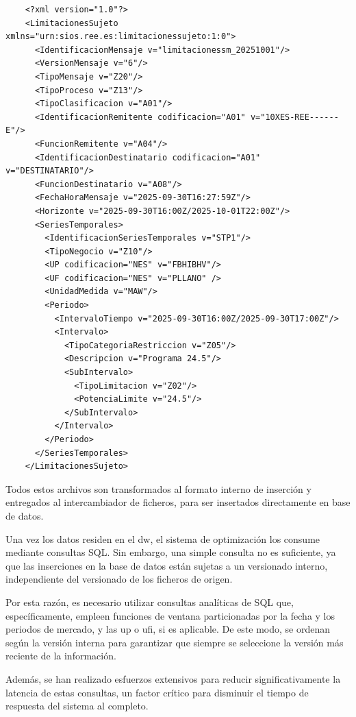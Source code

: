 \begin{samepage}
  \begin{verbatim}
    <?xml version="1.0"?>
    <LimitacionesSujeto xmlns="urn:sios.ree.es:limitacionessujeto:1:0">
      <IdentificacionMensaje v="limitacionessm_20251001"/>
      <VersionMensaje v="6"/>
      <TipoMensaje v="Z20"/>
      <TipoProceso v="Z13"/>
      <TipoClasificacion v="A01"/>
      <IdentificacionRemitente codificacion="A01" v="10XES-REE------E"/>
      <FuncionRemitente v="A04"/>
      <IdentificacionDestinatario codificacion="A01" v="DESTINATARIO"/>
      <FuncionDestinatario v="A08"/>
      <FechaHoraMensaje v="2025-09-30T16:27:59Z"/>
      <Horizonte v="2025-09-30T16:00Z/2025-10-01T22:00Z"/>
      <SeriesTemporales>
        <IdentificacionSeriesTemporales v="STP1"/>
        <TipoNegocio v="Z10"/>
        <UP codificacion="NES" v="FBHIBHV"/>
        <UF codificacion="NES" v="PLLANO" />
        <UnidadMedida v="MAW"/>
        <Periodo>
          <IntervaloTiempo v="2025-09-30T16:00Z/2025-09-30T17:00Z"/>
          <Intervalo>
            <TipoCategoriaRestriccion v="Z05"/>
            <Descripcion v="Programa 24.5"/>
            <SubIntervalo>
              <TipoLimitacion v="Z02"/>
              <PotenciaLimite v="24.5"/>
            </SubIntervalo>
          </Intervalo>
        </Periodo>
      </SeriesTemporales>
    </LimitacionesSujeto>
  \end{verbatim}
\end{samepage}

Todos estos archivos son transformados al formato interno de inserción y entregados al intercambiador de ficheros, para ser insertados directamente en base de datos.

Una vez los datos residen en el \gls{dw}, el sistema de optimización los consume mediante consultas SQL\@. Sin embargo, una simple consulta no es suficiente, ya que las inserciones en la base de datos están sujetas a un versionado interno, independiente del versionado de los ficheros de origen.

Por esta razón, es necesario utilizar consultas analíticas de SQL que, específicamente, empleen funciones de ventana particionadas por la fecha y los periodos de mercado, y las \gls{up} o \gls{ufi}, si es aplicable. De este modo, se ordenan según la versión interna para garantizar que siempre se seleccione la versión más reciente de la información.

Además, se han realizado esfuerzos extensivos para reducir significativamente la latencia de estas consultas, un factor crítico para disminuir el tiempo de respuesta del sistema al completo.

